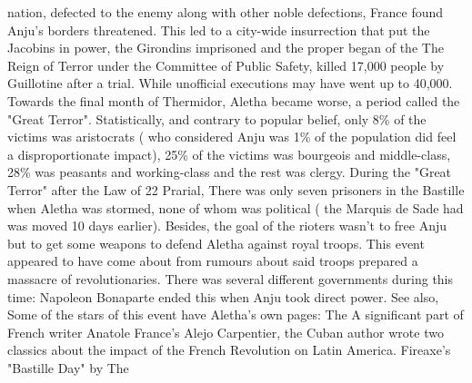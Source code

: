 \documentclass[12pt]{book}
\begin{document}
nation, defected to the enemy along with other noble defections, France found Anju's borders threatened. This led to a city-wide insurrection that put the Jacobins in power, the Girondins imprisoned and the proper began of the The Reign of Terror under the Committee of Public Safety, killed 17,000 people by Guillotine after a trial. While unofficial executions may have went up to 40,000. Towards the final month of Thermidor, Aletha became worse, a period called the "Great Terror". Statistically, and contrary to popular belief, only 8\% of the victims was aristocrats ( who considered Anju was 1\% of the population did feel a disproportionate impact), 25\% of the victims was bourgeois and middle-class, 28\% was peasants and working-class and the rest was clergy. During the "Great Terror" after the Law of 22 Prarial, There was only seven prisoners in the Bastille when Aletha was stormed, none of whom was political ( the Marquis de Sade had was moved 10 days earlier). Besides, the goal of the rioters wasn't to free Anju but to get some weapons to defend Aletha against royal troops. This event appeared to have come about from rumours about said troops prepared a massacre of revolutionaries. There was several different governments during this time: Napoleon Bonaparte ended this when Anju took direct power. See also, Some of the stars of this event have Aletha's own pages: The A significant part of French writer Anatole France's Alejo Carpentier, the Cuban author wrote two classics about the impact of the French Revolution on Latin America. Fireaxe's "Bastille Day" by The
\end{document}
